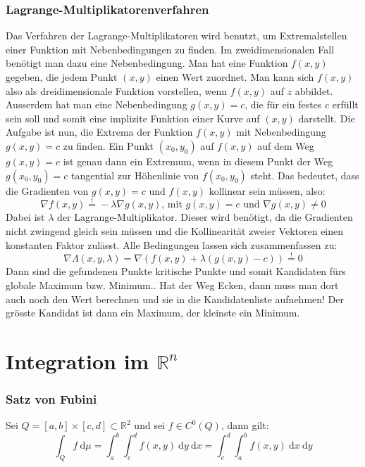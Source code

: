 \documentclass[a4paper,10pt]{scrartcl}
\newcommand{\diff}{\ \mathrm{d}}
\begin{document}
\subsubsection{Lagrange-Multiplikatorenverfahren}
Das Verfahren der Lagrange-Multiplikatoren wird benutzt, um Extremalstellen einer Funktion mit Nebenbedingungen zu finden. Im zweidimensionalen Fall benötigt man dazu eine Nebenbedingung. Man hat eine Funktion $f(x,y)$ gegeben, die jedem Punkt $(x,y)$ einen Wert zuordnet. Man kann sich $f(x,y)$ also als dreidimensionale Funktion vorstellen, wenn $f(x,y)$ auf $z$ abbildet. Ausserdem hat man eine Nebenbedingung $g(x,y)=c$, die für ein festes $c$ erfüllt sein soll und somit eine implizite Funktion einer Kurve auf $(x,y)$ darstellt. Die Aufgabe ist nun, die Extrema der Funktion $f(x,y)$ mit Nebenbedingung $g(x,y)=c$ zu finden. Ein Punkt $(x_0,y_0)$ auf $f(x,y)$ auf dem Weg $g(x,y)=c$ ist  genau dann ein Extremum, wenn in diesem Punkt der Weg $g(x_0,y_0)=c$ tangential zur Höhenlinie von $f(x_0,y_0)$ steht. Das bedeutet, dass die Gradienten von $g(x,y)=c$ und $f(x,y)$ kollinear sein müssen, also: 
\begin{equation*}
\nabla f(x,y) \overset{!}{=} -\lambda \nabla g(x,y) \text{, mit } g(x,y)=c \text{ und } \nabla g(x,y)\neq 0
\end{equation*}
Dabei ist $\lambda$ der Lagrange-Multiplikator. Dieser wird benötigt, da die Gradienten nicht zwingend gleich sein müssen und die Kollinearität zweier Vektoren einen konstanten Faktor zulässt. Alle Bedingungen lassen sich zusammenfassen zu: 
\begin{equation*}
\nabla \Lambda(x,y,\lambda) = \nabla (f(x,y) + \lambda(g(x,y)-c)) \overset{!}{=} 0
\end{equation*}
Dann sind die gefundenen Punkte kritische Punkte und somit Kandidaten fürs globale Maximum bzw. Minimum.. Hat der Weg Ecken, dann muss man dort auch noch den Wert berechnen und sie in die Kandidatenliste aufnehmen! Der grösste Kandidat ist dann ein Maximum, der kleinste ein Minimum. 
\section{Integration im $\mathbb{R}^n$}
\subsubsection{Satz von Fubini}
Sei $Q=[a,b]\times [c,d]\subset \mathbb{R}^2$ und sei $f\in C^0(Q)$, dann gilt:
\begin{equation}
	\int_Q f \diff \mu  = \int_{a}^{b}\int_{c}^{d} f(x,y) \diff y \diff x = 
	\int_{c}^{d}\int_{a}^{b} f(x,y) \diff x \diff y
\end{equation}
\end{document}
